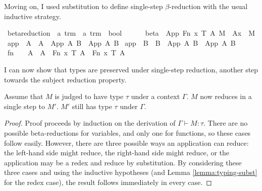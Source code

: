 Moving on, I used substitution to define single-step \(\beta\)-reduction with the usual inductive strategy.

\begin{implementation}
\isamarkupfalse%
\ beta{\isacharunderscore}reduction\ {\isacharcolon}{\isacharcolon}\ {\isachardoublequoteopen}{\isacharprime}a\ trm\ {\isasymRightarrow}\ {\isacharprime}a\ trm\ {\isasymRightarrow}\ bool{\isachardoublequoteclose}\ {\isacharparenleft}{\isachardoublequoteopen}{\isacharunderscore}\ {\isasymrightarrow}{\isasymbeta}\ {\isacharunderscore}{\isachardoublequoteclose}{\isacharparenright}\ \isanewline
\ \ beta{\isacharcolon}\ \ {\isachardoublequoteopen}{\isacharparenleft}App\ {\isacharparenleft}Fn\ x\ T\ A{\isacharparenright}\ M{\isacharparenright}\ {\isasymrightarrow}{\isasymbeta}\ {\isacharparenleft}A{\isacharbrackleft}x\ {\isacharcolon}{\isacharcolon}{\isacharequal}\ M{\isacharbrackright}{\isacharparenright}{\isachardoublequoteclose}\isanewline
{\isacharbar}\ app{}{\isacharcolon}\ \ {\isachardoublequoteopen}A\ {\isasymrightarrow}{\isasymbeta}\ A{\isacharprime}\ {\isasymLongrightarrow}\ {\isacharparenleft}App\ A\ B{\isacharparenright}\ {\isasymrightarrow}{\isasymbeta}\ {\isacharparenleft}App\ A{\isacharprime}\ B{\isacharparenright}{\isachardoublequoteclose}\isanewline
{\isacharbar}\ app{}{\isacharcolon}\ \ {\isachardoublequoteopen}B\ {\isasymrightarrow}{\isasymbeta}\ B{\isacharprime}\ {\isasymLongrightarrow}\ {\isacharparenleft}App\ A\ B{\isacharparenright}\ {\isasymrightarrow}{\isasymbeta}\ {\isacharparenleft}App\ A\ B{\isacharprime}{\isacharparenright}{\isachardoublequoteclose}\isanewline
{\isacharbar}\ fn{\isacharcolon}\ \ \ \ {\isachardoublequoteopen}A\ {\isasymrightarrow}{\isasymbeta}\ A{\isacharprime}\ {\isasymLongrightarrow}\ {\isacharparenleft}Fn\ x\ T\ A{\isacharparenright}\ {\isasymrightarrow}{\isasymbeta}\ {\isacharparenleft}Fn\ x\ T\ A{\isacharprime}{\isacharparenright}{\isachardoublequoteclose}\isanewline
\end{implementation}

I can now show that types are preserved under single-step reduction, another step towards the subject reduction property.
\begin{lemma}
\label{lemma:preservation'}
Assume that \(M\) is judged to have type \(\tau\) under a context \(\Gamma\).
\(M\) now reduces in a single step to \(M'\).
\(M'\) still has type \(\tau\) under \(\Gamma\).
\end{lemma}
\begin{proof}
Proof proceeds by induction on the derivation of \(\Gamma \vdash M : \tau\).
There are no possible beta-reductions for variables, and only one for functions, so these cases follow easily.
However, there are three possible ways an application can reduce: the left-hand side might reduce, the right-hand side might reduce, or the application may be a redex and reduce by substitution.
By considering these three cases and using the inductive hypotheses (and Lemma \ref{lemma:typing-subst} for the redex case), the result follows immediately in every case.
\end{proof}

